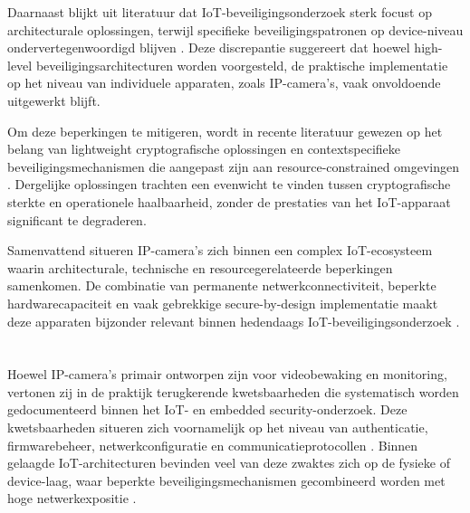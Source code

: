 Daarnaast blijkt uit literatuur dat IoT-beveiligingsonderzoek sterk focust op architecturale oplossingen, terwijl specifieke beveiligingspatronen op device-niveau ondervertegenwoordigd blijven \autocite{rajmohandecade}. Deze discrepantie suggereert dat hoewel high-level beveiligingsarchitecturen worden voorgesteld, de praktische implementatie op het niveau van individuele apparaten, zoals IP-camera’s, vaak onvoldoende uitgewerkt blijft.

Om deze beperkingen te mitigeren, wordt in recente literatuur gewezen op het belang van lightweight cryptografische oplossingen en contextspecifieke beveiligingsmechanismen die aangepast zijn aan resource-constrained omgevingen \autocite{kumar2024review}. Dergelijke oplossingen trachten een evenwicht te vinden tussen cryptografische sterkte en operationele haalbaarheid, zonder de prestaties van het IoT-apparaat significant te degraderen.

Samenvattend situeren IP-camera’s zich binnen een complex IoT-ecosysteem waarin architecturale, technische en resourcegerelateerde beperkingen samenkomen. De combinatie van permanente netwerkconnectiviteit, beperkte hardwarecapaciteit en vaak gebrekkige secure-by-design implementatie maakt deze apparaten bijzonder relevant binnen hedendaags IoT-beveiligingsonderzoek \autocite{MOHAMADNOOR2019283,rajmohandecade}.

\section{}%
\label{sec:typische-kwetsbaarheden}

Hoewel IP-camera’s primair ontworpen zijn voor videobewaking en monitoring, vertonen zij in de praktijk terugkerende kwetsbaarheden die systematisch worden gedocumenteerd binnen het IoT- en embedded security-onderzoek. Deze kwetsbaarheden situeren zich voornamelijk op het niveau van authenticatie, firmwarebeheer, netwerkconfiguratie en communicatieprotocollen \autocite{baho2023analysis,Butun2019arXivIoTSecurity,ENISA2024ThreatLandscape}. Binnen gelaagde IoT-architecturen bevinden veel van deze zwaktes zich op de fysieke of device-laag, waar beperkte beveiligingsmechanismen gecombineerd worden met hoge netwerkexpositie \autocite{baho2023analysis}.

\subsection{}%
\label{subsec:auth-defaults}

